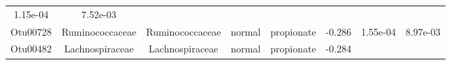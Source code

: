 \documentclass[11pt,]{article}
\begin{document}
\begin{longtable}[]{@{}cccccccc@{}}
\begin{minipage}[t]{0.08\columnwidth}
1.15e-04\strut
\end{minipage} & \begin{minipage}[t]{0.08\columnwidth}\centering\strut
7.52e-03\strut
\end{minipage}\tabularnewline
\begin{minipage}[t]{0.08\columnwidth}\centering\strut
Otu00728\strut
\end{minipage} & \begin{minipage}[t]{0.15\columnwidth}\centering\strut
Ruminococcaceae\strut
\end{minipage} & \begin{minipage}[t]{0.15\columnwidth}\centering\strut
Ruminococcaceae\strut
\end{minipage} & \begin{minipage}[t]{0.08\columnwidth}\centering\strut
normal\strut
\end{minipage} & \begin{minipage}[t]{0.09\columnwidth}\centering\strut
propionate\strut
\end{minipage} & \begin{minipage}[t]{0.07\columnwidth}\centering\strut
-0.286\strut
\end{minipage} & \begin{minipage}[t]{0.08\columnwidth}\centering\strut
1.55e-04\strut
\end{minipage} & \begin{minipage}[t]{0.08\columnwidth}\centering\strut
8.97e-03\strut
\end{minipage}\tabularnewline
\begin{minipage}[t]{0.08\columnwidth}\centering\strut
Otu00482\strut
\end{minipage} & \begin{minipage}[t]{0.15\columnwidth}\centering\strut
Lachnospiraceae\strut
\end{minipage} & \begin{minipage}[t]{0.15\columnwidth}\centering\strut
Lachnospiraceae\strut
\end{minipage} & \begin{minipage}[t]{0.08\columnwidth}\centering\strut
normal\strut
\end{minipage} & \begin{minipage}[t]{0.09\columnwidth}\centering\strut
propionate\strut
\end{minipage} & \begin{minipage}[t]{0.07\columnwidth}\centering\strut
-0.284\strut
\end{minipage} & \begin{minipage}[t]{0.08\columnwidth}\centering\strut

\end{minipage}
\end{longtable}
\end{document}
